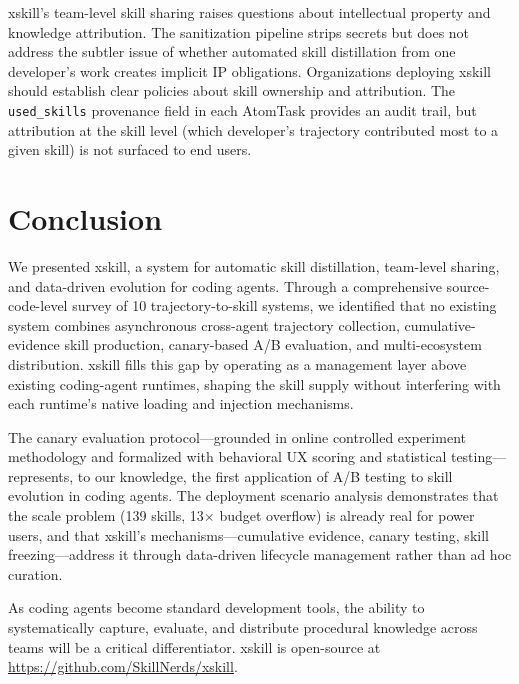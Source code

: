 \documentclass{article}
\begin{document}
xskill's team-level skill sharing raises questions about intellectual property and knowledge attribution. The sanitization pipeline strips secrets but does not address the subtler issue of whether automated skill distillation from one developer's work creates implicit IP obligations. Organizations deploying xskill should establish clear policies about skill ownership and attribution. The \texttt{used\_skills} provenance field in each AtomTask provides an audit trail, but attribution at the skill level (which developer's trajectory contributed most to a given skill) is not surfaced to end users.

\section{Conclusion}
\label{sec:conclusion}

We presented xskill, a system for automatic skill distillation, team-level sharing, and data-driven evolution for coding agents. Through a comprehensive source-code-level survey of 10 trajectory-to-skill systems, we identified that no existing system combines asynchronous cross-agent trajectory collection, cumulative-evidence skill production, canary-based A/B evaluation, and multi-ecosystem distribution. xskill fills this gap by operating as a management layer above existing coding-agent runtimes, shaping the skill supply without interfering with each runtime's native loading and injection mechanisms.

The canary evaluation protocol---grounded in online controlled experiment methodology and formalized with behavioral UX scoring and statistical testing---represents, to our knowledge, the first application of A/B testing to skill evolution in coding agents. The deployment scenario analysis demonstrates that the scale problem (139 skills, 13$\times$ budget overflow) is already real for power users, and that xskill's mechanisms---cumulative evidence, canary testing, skill freezing---address it through data-driven lifecycle management rather than ad hoc curation.

As coding agents become standard development tools, the ability to systematically capture, evaluate, and distribute procedural knowledge across teams will be a critical differentiator. xskill is open-source at \url{https://github.com/SkillNerds/xskill}.

\end{document}
